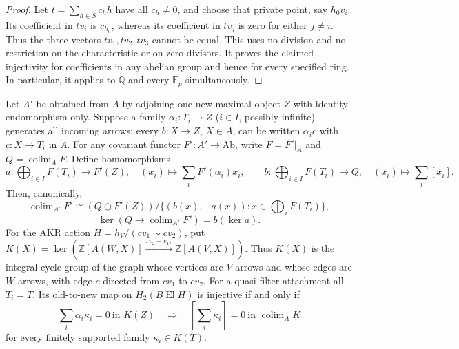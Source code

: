 \begin{proof}
Let $t=\sum_{h\in S}c_hh$ have all $c_h\ne0$, and choose that private
point, say $h_0v_i$. Its coefficient in $tv_i$ is $c_{h_0}$, whereas
its coefficient in $tv_j$ is zero for either $j\ne i$. Thus the three
vectors $tv_1,tv_2,tv_3$ cannot be equal. This uses no division and no
restriction on the characteristic or on zero divisors. It proves the
claimed injectivity for coefficients in any abelian group and hence
for every specified ring. In particular, it applies to
$\mathbb Q$ and every $\mathbb F_p$ simultaneously.
\end{proof}

\begin{proposition}\label{C:attachment-cycle-test}
Let $A'$ be obtained from $A$ by adjoining one new maximal object $Z$
with identity endomorphism only. Suppose a family
$\alpha_i:T_i\to Z$ ($i\in I$, possibly infinite) generates all incoming
arrows: every $b:X\to Z$, $X\in A$, can be written
$\alpha_i c$ with $c:X\to T_i$ in $A$. For any covariant functor
$F':A'\to\mathrm{Ab}$, write $F=F'|_A$ and
$Q=\operatorname{colim}_A F$. Define homomorphisms
\[
 a:\bigoplus_{i\in I}F(T_i)\longrightarrow F'(Z),\quad
   (x_i)\longmapsto\sum_i F'(\alpha_i)x_i,
 \qquad
 b:\bigoplus_{i\in I}F(T_i)\longrightarrow Q,\quad
   (x_i)\longmapsto\sum_i[x_i].
\]
Then, canonically,
\[
 \operatorname{colim}_{A'}F'
   \cong (Q\oplus F'(Z))/\{(b(x),-a(x)):x\in\bigoplus_iF(T_i)\},
\]
\[
 \ker(Q\to\operatorname{colim}_{A'}F')=b(\ker a).
\]
For the AKR action
$H=h_V/(cv_1\sim cv_2)$, put
$K(X)=\ker(\mathbb Z[A(W,X)]\xrightarrow{,v_2-v_1,}
\mathbb Z[A(V,X)])$. Thus $K(X)$ is the integral cycle group of the
graph whose vertices are $V$-arrows and whose edges are $W$-arrows,
with edge $c$ directed from $cv_1$ to $cv_2$. For a quasi-filter
attachment all $T_i=T$. Its old-to-new map on $H_2(B\operatorname{El}H)$
is injective if and only if
\[
 \sum_i\alpha_i\kappa_i=0\ \text{in }K(Z)
 \quad\Longrightarrow\quad
 \left[\sum_i\kappa_i\right]=0\ \text{in }\operatorname{colim}_A K
\]
for every finitely supported family $\kappa_i\in K(T)$.
\end{proposition}
